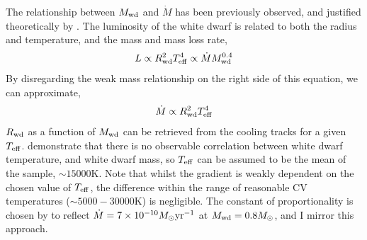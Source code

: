 The relationship between $M_{\rm wd}$ and $\dot M$ has been previously observed, and justified theoretically by \citep{Pala2021}.
The luminosity of the white dwarf is related to both the radius and temperature, and the mass and mass loss rate,
\begin{equation}
    L \propto R^2_{\rm wd} T_{\rm eff}^4 \propto \dot M M_{\rm wd}^{0.4}
\end{equation}
By disregarding the weak mass relationship on the right side of this equation, we can approximate,
\begin{equation}
    \label{eqn:massloss and AML:white dwarf mass radius relationship to massloss}
    \dot M \propto R_{\rm wd}^2 T_{\rm eff}^4
\end{equation}
$R_{\rm wd}$ as a function of $M_{\rm wd}$ can be retrieved from the \citep{Bergeron1995} cooling tracks for a given $T_{\rm eff}$.
\citet{Pala2021} demonstrate that there is no observable correlation between white dwarf temperature, and white dwarf mass, so $T_{\rm eff}$ can be assumed to be the mean of the \citet{Pala2021} sample, $\sim 15000$K.
Note that whilst the gradient is weakly dependent on the chosen value of $T_{\rm eff}$, the difference within the range of reasonable CV temperatures ($\sim 5000 - 30000$K) is negligible.
The constant of proportionality is chosen by \citep{Pala2021} to reflect $\dot M = 7\times 10^{-10} M_\odot {\rm yr^{-1}}$ at $M_{\rm wd} = 0.8 M_\odot$, and I mirror this approach.

